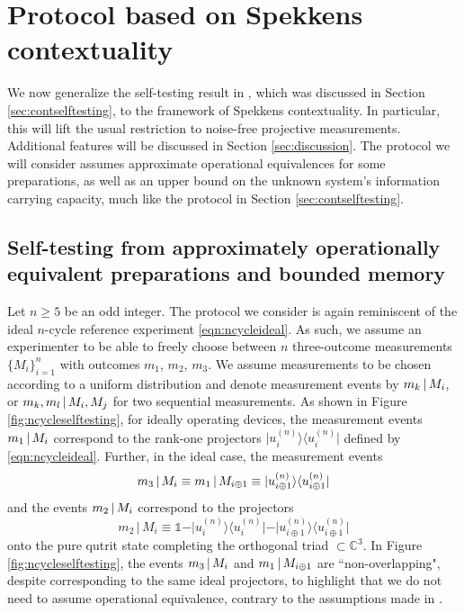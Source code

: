 \chapter{Protocol based on Spekkens contextuality}
\label{sec:protocols}
We now generalize the self-testing result in \cite{Bharti2019}, which was discussed in Section \ref{sec:contselftesting}, to the framework of Spekkens contextuality. In particular, this will lift the usual restriction to noise-free projective measurements. Additional features will be discussed in Section \ref{sec:discussion}. The protocol we will consider assumes approximate operational equivalences for some preparations, as well as an upper bound on the unknown system's information carrying capacity, much like the protocol in Section \ref{sec:contselftesting}.
\section{Self-testing from approximately operationally equivalent preparations and bounded memory}
Let $n\geq 5$ be an odd integer. The protocol we consider is again reminiscent of the ideal $n$-cycle reference experiment \ref{eqn:ncycleideal}. As such, we assume an experimenter to be able to freely choose between $n$ three-outcome measurements $\{M_i\}_{i=1}^n$ with outcomes $m_1$, $m_2$, $m_3$. We assume measurements to be chosen according to a uniform distribution and denote measurement events by  $m_k\thinspace\vert\thinspace M_i$, or $m_k,m_l\thinspace\vert\thinspace M_i,M_j$ for two sequential measurements. As shown in Figure \ref{fig:ncycleselftesting}, for ideally operating devices, the measurement events $m_1 \thinspace\vert\thinspace M_i$ correspond to the rank-one projectors $\vert u_i^{(n)}\rangle\langle u_i^{(n)}\vert$ defined by \ref{eqn:ncycleideal}. Further, in the ideal case, the measurement events \begin{equation*}
m_3\thinspace\vert\thinspace M_i\equiv m_1\thinspace\vert\thinspace M_{i\oplus 1}\equiv\vert u_{i\oplus 1}^{(n)}\rangle\langle u_{i\oplus 1}^{(n)}\vert
\end{equation*}and the events $m_2\thinspace\vert\thinspace M_i$ correspond to the projectors 
\begin{equation*}
m_2\,\vert\,M_i\equiv \mathbb{1}-\vert u_i^{(n)}\rangle\langle u_i^{(n)}\vert-\vert u_{i\oplus 1}^{(n)}\rangle\langle u_{i\oplus 1}^{(n)}\vert
\end{equation*} onto the pure qutrit state completing the orthogonal triad $\subset \mathbb{C}^3$. In Figure \ref{fig:ncycleselftesting}, the events $m_3\thinspace \vert\thinspace M_i$ and $m_1\thinspace\vert\thinspace M_{i\oplus 1}$ are ``non-overlapping", despite corresponding to the same ideal projectors, to highlight that we do not need to assume operational equivalence, contrary to the assumptions made in \cite{Kunjwal2019}.

